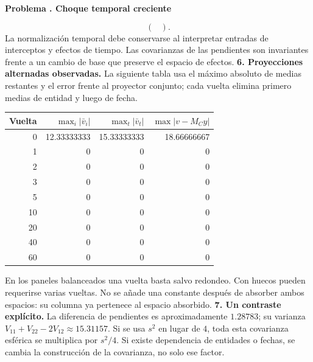 \documentclass[11pt,a4paper]{article}
\theoremstyle{definition}
\newcounter{problema}
\newenvironment{resuelto}[1]{\refstepcounter{problema}\par\medskip\Needspace{6\baselineskip}\textbf{Problema \theproblema. #1}\par}{\par\medskip}
\begin{document}
\begin{resuelto}{Choque temporal creciente}
{\[\begin{pmatrix}
\end{pmatrix}.
\]
}
La normalización temporal debe conservarse al interpretar entradas de interceptos y efectos de tiempo. Las covarianzas de las pendientes son invariantes frente a un cambio de base que preserve el espacio de efectos.
\textbf{6. Proyecciones alternadas observadas.} La siguiente tabla usa el máximo absoluto de medias restantes y el error frente al proyector conjunto; cada vuelta elimina primero medias de entidad y luego de fecha.

\begin{center}\small
\begin{tabular}{rrrr}
\toprule
Vuelta&$\max_i|\bar v_i|$&$\max_t|\bar v_t|$&$\max|v-M_Cy|$\\
\midrule
0&12.33333333&15.33333333&18.66666667\\
1&0&0&0\\
2&0&0&0\\
3&0&0&0\\
5&0&0&0\\
10&0&0&0\\
20&0&0&0\\
40&0&0&0\\
60&0&0&0\\
\bottomrule
\end{tabular}
\end{center}
En los paneles balanceados una vuelta basta salvo redondeo. Con huecos pueden requerirse varias vueltas. No se añade una constante después de absorber ambos espacios: su columna ya pertenece al espacio absorbido.
\textbf{7. Un contraste explícito.} La diferencia de pendientes es aproximadamente $1.28783$; su varianza $V_{11}+V_{22}-2V_{12}\approx15.31157$. Si se usa $s^2$ en lugar de $4$, toda esta covarianza esférica se multiplica por $s^2/4$. Si existe dependencia de entidades o fechas, se cambia la construcción de la covarianza, no solo ese factor.
\end{resuelto}
\end{document}
